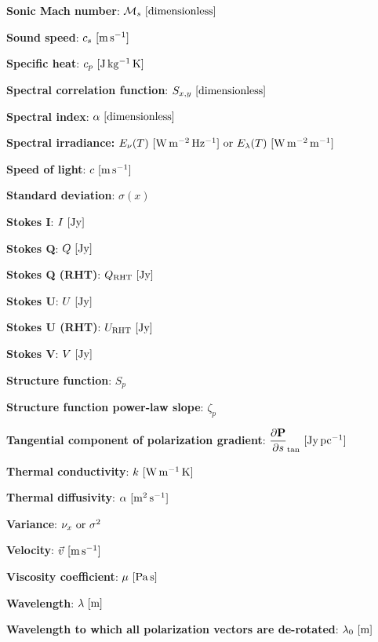 \documentclass[a4paper,10pt]{article}
\begin{document}
{\noindent}\textbf{Sonic Mach number}: $\mathcal{M}_s~[{\rm dimensionless]}$

{\noindent}\textbf{Sound speed}: $c_s ~ [{\rm m\,s^{-1}}]$

{\noindent}\textbf{Specific heat}: $c_p ~ [{\rm J\,kg^{-1}\,K}]$

{\noindent}\textbf{Spectral correlation function}: $S_{x,y}~[\rm{dimensionless}]$

{\noindent}\textbf{Spectral index}: $\alpha~[\rm{dimensionless}]$

{\noindent}\textbf{Spectral irradiance:} $E_\nu(T)~[{\rm W\,m^{-2}\,Hz^{-1}}]~{\rm or}~E_\lambda(T)~[{\rm W\,m^{-2}\,m^{-1}}]$

{\noindent}\textbf{Speed of light}: $c~[\rm{m\,s^{-1}}]$

{\noindent}\textbf{Standard deviation}: $\sigma(x)$

{\noindent}\textbf{Stokes I}: $I ~ [\rm Jy]$

{\noindent}\textbf{Stokes Q}: $Q ~ [\rm Jy]$

{\noindent}\textbf{Stokes Q (RHT)}: $Q_\mathrm{RHT} ~ [\rm Jy]$

{\noindent}\textbf{Stokes U}: $U ~ [\rm Jy]$

{\noindent}\textbf{Stokes U (RHT)}: $U_\mathrm{RHT} ~ [\rm Jy]$

{\noindent}\textbf{Stokes V}: $V ~ [\rm Jy]$

{\noindent}\textbf{Structure function}: $S_p$

{\noindent}\textbf{Structure function power-law slope}: $\zeta_p$

{\noindent}\textbf{Tangential component of polarization gradient}: $\dfrac{\partial\mathbf{P}}{\partial s}_\mathrm{tan} ~ [{\rm Jy\,pc^{-1}}]$

{\noindent}\textbf{Thermal conductivity}: $k ~ [{\rm W\,m^{-1}\,K}]$

{\noindent}\textbf{Thermal diffusivity}: $\alpha ~ [{\rm m^2\,s^{-1}}]$

{\noindent}\textbf{Variance}: $\nu_x~{\rm or}~\sigma^2$

{\noindent}\textbf{Velocity}: $\vec{v} ~ [{\rm m\,s^{-1}}]$

{\noindent}\textbf{Viscosity coefficient}: $\mu ~ [{\rm Pa\,s}]$

{\noindent}\textbf{Wavelength}: $\lambda~[{\rm m}]$

{\noindent}\textbf{Wavelength to which all polarization vectors are de-rotated}: $\lambda_0~[{\rm m}]$
\end{document}
